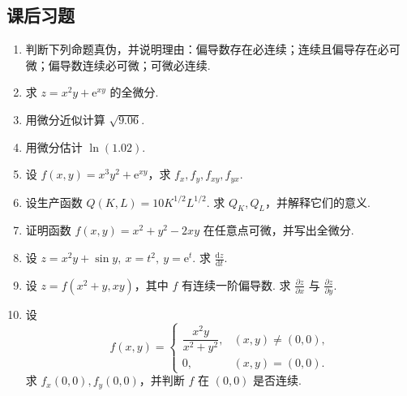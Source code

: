 \documentclass[fontset=fandol]{ctexart}
\newcommand{\dd}{\mathrm{d}}
\newcommand{\ee}{\mathrm{e}}
\begin{document}
\subsection{课后习题}
\begin{enumerate}[label=\textbf{练习\arabic*.},leftmargin=2.2em]
\item 判断下列命题真伪，并说明理由：偏导数存在必连续；连续且偏导存在必可微；偏导数连续必可微；可微必连续.
\item 求 $z=x^2y+\ee^{xy}$ 的全微分.
\item 用微分近似计算 $\sqrt{9.06}$.
\item 用微分估计 $\ln(1.02)$.
\item 设 $f(x,y)=x^3y^2+\ee^{xy}$，求 $f_x,f_y,f_{xy},f_{yx}$.
\item 设生产函数 $Q(K,L)=10K^{1/2}L^{1/2}$. 求 $Q_K,Q_L$，并解释它们的意义.
\item 证明函数 $f(x,y)=x^2+y^2-2xy$ 在任意点可微，并写出全微分.
\item 设 $z=x^2y+\sin y,\ x=t^2,\ y=\ee^t$. 求 $\frac{\dd z}{\dd t}$.
\item 设 $z=f(x^2+y,xy)$，其中 $f$ 有连续一阶偏导数. 求 $\frac{\partial z}{\partial x}$ 与 $\frac{\partial z}{\partial y}$.
\item 设
\[
f(x,y)=
\begin{cases}
\dfrac{x^2y}{x^2+y^2},&(x,y)\neq(0,0),\\[0.6em]
0,&(x,y)=(0,0).
\end{cases}
\]
求 $f_x(0,0),f_y(0,0)$，并判断 $f$ 在 $(0,0)$ 是否连续.
\end{enumerate}
\end{document}
